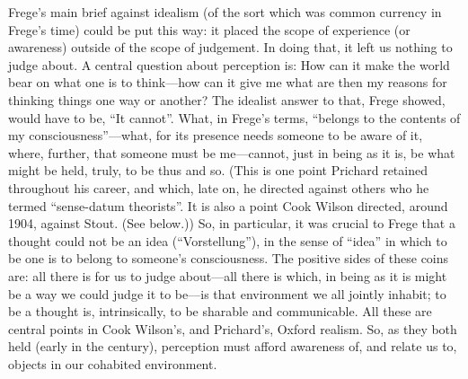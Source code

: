 Frege's main brief against idealism (of the sort which was common currency in Frege's time) could be put this way: it placed the scope of experience (or awareness) outside of the scope of judgement. In doing that, it left us nothing to judge about. A central question about perception is: How can it make the world bear on what one is to think---how can it give me what are then my reasons for thinking things one way or another? The idealist answer to that, Frege showed, would have to be, ``It cannot''. What, in Frege's terms, ``belongs to the contents of my consciousness''---what, for its presence needs someone to be aware of it, where, further, that someone must be me---cannot, just in being as it is, be what might be held, truly, to be thus and so. (This is one point Prichard retained throughout his career, and which, late on, he directed against others who he termed ``sense-datum theorists''. It is also a point Cook Wilson directed, around 1904, against Stout. (See below.)) So, in particular, it was crucial to Frege that a thought could not be an idea (``Vorstellung''), in the sense of ``idea'' in which to be one is to belong to someone’s consciousness. The positive sides of these coins are: all there is for us to judge about---all there is which, in being as it is might be a way we could judge it to be---is that environment we all jointly inhabit; to be a thought is, intrinsically, to be sharable and communicable. All these are central points in Cook Wilson's, and Prichard's, Oxford realism. So, as they both held (early in the century), perception must afford awareness of, and relate us to, objects in our cohabited environment.

